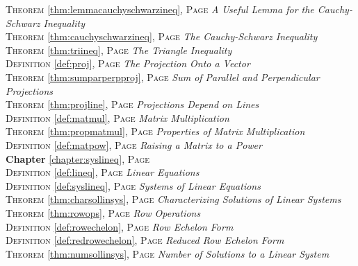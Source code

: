 \begin{multicols}{2}
{\textsc{Theorem} \ref{thm:lemmacauchyschwarzineq}, \textsc{Page} \pageref{thm:lemmacauchyschwarzineq} \textit{A Useful Lemma for the Cauchy-Schwarz Inequality} \\
\textsc{Theorem} \ref{thm:cauchyschwarzineq}, \textsc{Page} \pageref{thm:cauchyschwarzineq} \textit{The Cauchy-Schwarz Inequality} \\
\textsc{Theorem} \ref{thm:triineq}, \textsc{Page} \pageref{thm:triineq} \textit{The Triangle Inequality} \\
\textsc{Definition} \ref{def:proj}, \textsc{Page} \pageref{def:proj} \textit{The Projection Onto a Vector} \\
\textsc{Theorem} \ref{thm:sumparperpproj}, \textsc{Page} \pageref{thm:sumparperpproj} \textit{Sum of Parallel and Perpendicular Projections} \\
\textsc{Theorem} \ref{thm:projline}, \textsc{Page} \pageref{thm:projline} \textit{Projections Depend on Lines} \\
\textsc{Definition} \ref{def:matmul}, \textsc{Page} \pageref{def:matmul} \textit{Matrix Multiplication} \\
\textsc{Theorem} \ref{thm:propmatmul}, \textsc{Page} \pageref{thm:propmatmul} \textit{Properties of Matrix Multiplication} \\
\textsc{Definition} \ref{def:matpow}, \textsc{Page} \pageref{def:matpow} \textit{Raising a Matrix to a Power} \\
\textbf{Chapter} \ref{chapter:syslineq}, \textsc{Page} \pageref{chapter:syslineq} \\
\textsc{Definition} \ref{def:lineq}, \textsc{Page} \pageref{def:lineq} \textit{Linear Equations} \\
\textsc{Definition} \ref{def:syslineq}, \textsc{Page} \pageref{def:syslineq} \textit{Systems of Linear Equations} \\
\textsc{Theorem} \ref{thm:charsollinsys}, \textsc{Page} \pageref{thm:charsollinsys} \textit{Characterizing Solutions of Linear Systems} \\
\textsc{Theorem} \ref{thm:rowops}, \textsc{Page} \pageref{thm:rowops} \textit{Row Operations} \\
\textsc{Definition} \ref{def:rowechelon}, \textsc{Page} \pageref{def:rowechelon} \textit{Row Echelon Form} \\
\textsc{Definition} \ref{def:redrowechelon}, \textsc{Page} \pageref{def:redrowechelon} \textit{Reduced Row Echelon Form} \\
\textsc{Theorem} \ref{thm:numsollinsys}, \textsc{Page} \pageref{thm:numsollinsys} \textit{Number of Solutions to a Linear System} \\
}
\end{multicols}
